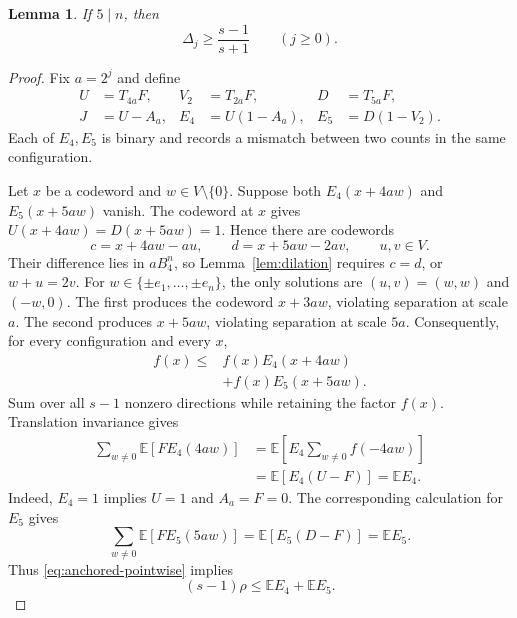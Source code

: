 \documentclass[12pt,letterpaper,onecolumn]{article}
\newtheorem{lemma}[theorem]{Lemma}
\theoremstyle{definition}
\newcommand{\E}{\mathbb{E}}
\begin{document}
\begin{lemma}\label{lem:charge}
If $5\mid n$, then
\begin{equation}\label{eq:seed}
 \Delta_j\ge\frac{s-1}{s+1}\qquad(j\ge0).
\end{equation}
\end{lemma}
\begin{proof}
Fix $a=2^j$ and define
\begin{align*}
 U&=T_{4a}F,&V_2&=T_{2a}F,&D&=T_{5a}F,\\
 J&=U-A_a,&E_4&=U(1-A_a),&E_5&=D(1-V_2).
\end{align*}
Each of $E_4,E_5$ is binary and records a mismatch between two counts in the same configuration.

Let $x$ be a codeword and $w\in V\setminus\{0\}$. Suppose both $E_4(x+4aw)$ and $E_5(x+5aw)$ vanish. The codeword at $x$ gives $U(x+4aw)=D(x+5aw)=1$. Hence there are codewords
\begin{equation}\label{eq:two-codewords}
 c=x+4aw-au,\qquad d=x+5aw-2av,
 \qquad u,v\in V.
\end{equation}
Their difference lies in $aB_4^n$, so Lemma~\ref{lem:dilation} requires $c=d$, or $w+u=2v$. For $w\in\{\pm e_1,\ldots,\pm e_n\}$, the only solutions are $(u,v)=(w,w)$ and $(-w,0)$. The first produces the codeword $x+3aw$, violating separation at scale $a$. The second produces $x+5aw$, violating separation at scale $5a$. Consequently, for every configuration and every $x$,
\begin{align}\label{eq:anchored-pointwise}
 f(x)\le{}&f(x)E_4(x+4aw)\nonumber\\
 &+f(x)E_5(x+5aw).
\end{align}
Sum over all $s-1$ nonzero directions while retaining the factor $f(x)$. Translation invariance gives
\begin{align}\label{eq:count-once}
 \sum_{w\ne0}\E[F E_4(4aw)]
 &=\E\!\left[E_4\sum_{w\ne0}f(-4aw)\right]\nonumber\\
 &=\E[E_4(U-F)]=\E E_4.
\end{align}
Indeed, $E_4=1$ implies $U=1$ and $A_a=F=0$. The corresponding calculation for $E_5$ gives
\[
 \sum_{w\ne0}\E[F E_5(5aw)]=\E[E_5(D-F)]=\E E_5.
\]
Thus \eqref{eq:anchored-pointwise} implies
\begin{equation}\label{eq:anchored}
 (s-1)\rho\le\E E_4+\E E_5.
\end{equation}


\end{proof}
\end{document}
